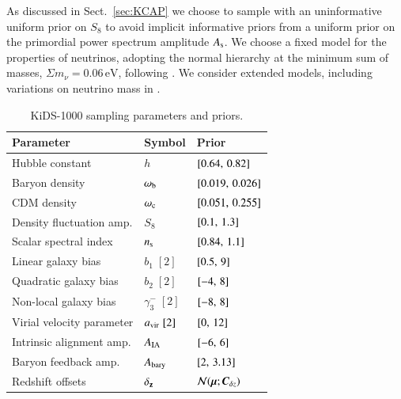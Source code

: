 \begin{appendix}
As discussed in Sect.~\ref{sec:KCAP} we choose to sample with an uninformative uniform prior on $S_8$ to avoid implicit informative priors from a uniform prior on the primordial power spectrum amplitude $A_{\rm s}$.    
We choose a fixed model for the properties of neutrinos, adopting the normal hierarchy at the minimum sum of masses, $\Sigma m_\nu = 0.06\,\mathrm{eV}$, following \citet{planck/etal:2018}.  
We consider extended models, including variations on neutrino mass in \citet{troester/etal:inprep}.

\begin{table}
\caption{KiDS-1000 sampling parameters and priors.}              %
\label{tab:priors}      %
\centering                                      %
\begin{tabular}{lll}          %
\toprule
Parameter & Symbol & Prior \\    %
\midrule                                   %
Hubble constant & $h$ & $\left[ 0.64,\,0.82 \right]$ \\
Baryon density & $\omega_{\rm b}$ & $\left[ 0.019,\,0.026 \right]$ \\
CDM density & $\omega_{\rm c}$ & $\left[ 0.051,\,0.255 \right]$ \\
Density fluctuation amp. & $S_8$ & $\left[ 0.1,\,1.3 \right]$ \\
Scalar spectral index & $n_{\rm s}$ & $\left[ 0.84,\,1.1 \right]$ \\
\midrule
Linear galaxy bias & $b_1 \;[2]$ & $\left[ 0.5,\,9 \right]$ \\
Quadratic galaxy bias & $b_2 \;[2]$ & $\left[ -4,\,8 \right]$ \\
Non-local galaxy bias & ${\gamma_3^-} \;[2]$ & $\left[ -8,\,8 \right]$ \\
Virial velocity parameter & $a_{\rm vir} \;[2]$ & $\left[ 0,\,12 \right]$ \\
Intrinsic alignment amp. & $A_{\rm IA}$ & $\left[ -6,\,6 \right]$ \\
Baryon feedback amp. & $A_{\rm bary}$ & $\left[ 2,\,3.13 \right]$ \\
\midrule
Redshift offsets & ${\bf \delta_z}$ & ${\cal N}(\mbox{\boldmath $\mu$};\mbox{\boldmath $C$}_{\delta z})$ \\
\bottomrule
\end{tabular}
\end{table}


\end{appendix}
